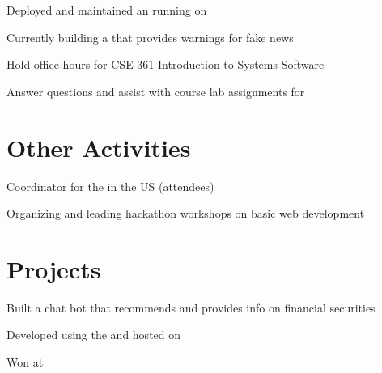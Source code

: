 \documentclass[]{deedy-resume-openfont}
\begin{document}
\begin{minipage}[t]{0.66\textwidth}
\begin{tightemize}
\item Deployed and maintained an  running  on  
\item Currently building a  that provides warnings for fake news
\end{tightemize}
\sectionsep

\begin{tightemize}
\item Hold office hours for CSE 361 Introduction to Systems Software
\item Answer questions and assist with course lab assignments for 
\end{tightemize}
\sectionsep


\section{Other Activities}

\begin{tightemize}
\item Coordinator for the  in the US (attendees)
\item Organizing and leading hackathon workshops on basic web development
\end{tightemize}
\sectionsep


\section{Projects}
\descript{}
\begin{tightemize}
\item Built a chat bot that recommends and provides info on financial securities
\item Developed using the  and hosted on 
\item Won  at 
\end{tightemize}
\sectionsep


\end{minipage}
\end{document}

